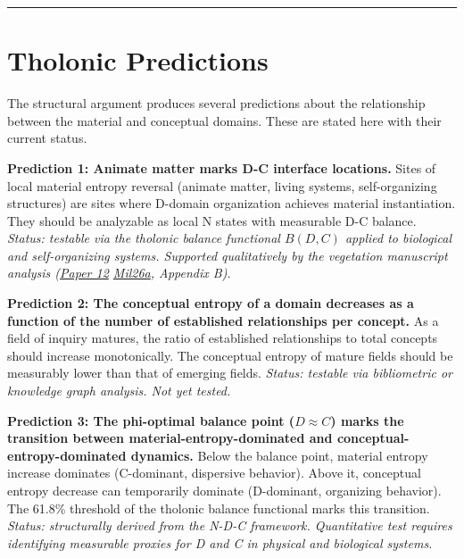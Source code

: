 \documentclass[12pt]{article}
\begin{document}
\begin{center}\rule{0.5\linewidth}{0.5pt}\end{center}

\section{Tholonic Predictions}\label{tholonic-predictions}

The structural argument produces several predictions about the
relationship between the material and conceptual domains. These are
stated here with their current status.

\textbf{Prediction 1: Animate matter marks D-C interface locations.}
Sites of local material entropy reversal (animate matter, living
systems, self-organizing structures) are sites where D-domain
organization achieves material instantiation. They should be analyzable
as local N states with measurable D-C balance. \emph{Status: testable
via the tholonic balance functional \(B(D,C)\) applied to biological and
self-organizing systems. Supported qualitatively by the vegetation
manuscript analysis
(\href{https://github.com/baardev/truevalue/blob/main/docnav/Research/papers/12_newton-tholonic-framework/12_newton-tholonic-framework.pdf}{Paper
12}
\href{https://github.com/baardev/truevalue/blob/main/docnav/Research/papers/12_newton-tholonic-framework/12_newton-tholonic-framework.pdf}{Mil26a},
Appendix B).}

\textbf{Prediction 2: The conceptual entropy of a domain decreases as a
function of the number of established relationships per concept.} As a
field of inquiry matures, the ratio of established relationships to
total concepts should increase monotonically. The conceptual entropy of
mature fields should be measurably lower than that of emerging fields.
\emph{Status: testable via bibliometric or knowledge graph analysis. Not
yet tested.}

\textbf{Prediction 3: The phi-optimal balance point (\(D \approx C\))
marks the transition between material-entropy-dominated and
conceptual-entropy-dominated dynamics.} Below the balance point,
material entropy increase dominates (C-dominant, dispersive behavior).
Above it, conceptual entropy decrease can temporarily dominate
(D-dominant, organizing behavior). The 61.8\% threshold of the tholonic
balance functional marks this transition. \emph{Status: structurally
derived from the N-D-C framework. Quantitative test requires identifying
measurable proxies for D and C in physical and biological systems.}
\end{document}
